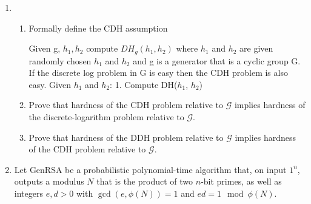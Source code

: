 \documentclass{article}
\begin{document}
\begin{enumerate}
\begin{enumerate}
        \begin{proof}
          Let $p, q \in \mathbb{Z}$ such that $p, q$ are distinct primes. $N =
          pq$. Let $e, d \in \mathbb{Z}$ such that $ed \equiv 1 \pmod{\phi(N)}$.
          Consider $\phi(N)$.

          Since $N$ is composite, $\phi(N) = (p - 1)(q - 1)$.

          Since $ed \equiv 1 \pmod{\phi(N)}$, $ed \equiv \pmod{(p - 1)(q - 1)}$,
          so $ed \equiv 1 + (p - 1)(q - 1)k$, for some $k \in \mathbb{Z}$.

          Now consider, $x^{ed}$. $x^{ed} = x^{(p - 1)(q - 1) + 1} = x^{(p -
            1)}x^{(q - 1)}x$

          Now, since $p - 1$ and $q - 1$ are inverses ($\mod (p - 1)(q - 1)$),
          $x^{p - 1}x^{q - 1}x = 1 * 1 * x = x$.

          So, $x^{ed} = x$.
         \end{proof}

      \item If $N = pq$ and $ed = 1 \mod \phi(N)$ then for all $x \in Z_N$ we
        have $(x^e)^d = x \mod N$.
    \end{enumerate}
  \item 
    \begin{enumerate}
      \item Formally define the CDH assumption

      Given g, $h_1, h_2$ compute $DH_g(h_1, h_2)$ where $h_1$ and $h_2$ are given randomly chosen $h_1$ and $h_2$ and g is a generator that is a cyclic group G. 
      If the discrete log problem in G is easy then the CDH problem is also easy. 
      Given $h_1$ and $h_2$:
      1. Compute DH($h_1$, $h_2$)
      
      \item Prove that hardness of the CDH problem relative to $\mathcal{G}$ implies
        hardness of the discrete-logarithm problem relative to $\mathcal{G}$.
      \item Prove that hardness of the DDH problem relative to $\mathcal{G}$
        implies hardness of the CDH problem relative to $\mathcal{G}$.
    \end{enumerate}
  \item Let \textsf{GenRSA} be a probabilistic polynomial-time algorithm that,
    on input $1^n$, outputs a modulus $N$ that is the product of two $n$-bit 
    primes, as well as integers $e, d > 0$ with $\gcd(e, \phi(N)) = 1$ and 
    $ed = 1 \mod \phi(N)$.


\end{enumerate}
\end{document}
